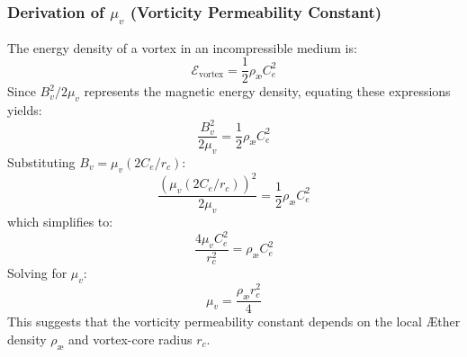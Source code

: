 \subsubsection*{Derivation of $\mu_v$ (Vorticity Permeability Constant)}
    The energy density of a vortex in an incompressible medium is:
    \begin{equation}
        \mathcal{E}_\text{vortex} = \frac{1}{2} \rho_{\text{\ae}} C_e^2
    \end{equation}
    Since $B_v^2 / 2 \mu_v$ represents the magnetic energy density, equating these expressions yields:
    \begin{equation*}
        \frac{B_v^2}{2 \mu_v} = \frac{1}{2} \rho_{\text{\ae}} C_e^2
    \end{equation*}
    Substituting $B_v = \mu_v (2 C_e / r_c)$:
    \begin{equation*}
        \frac{(\mu_v (2 C_e / r_c))^2}{2 \mu_v} = \frac{1}{2} \rho_{\text{\ae}} C_e^2
    \end{equation*}
    which simplifies to:
    \begin{equation*}
        \frac{4 \mu_v C_e^2}{r_c^2} = \rho_{\text{\ae}} C_e^2
    \end{equation*}
    Solving for $\mu_v$:
    \begin{equation}
        \mu_v = \frac{\rho_{\text{\ae}} r_c^2}{4}
    \end{equation}
    This suggests that the vorticity permeability constant depends on the local \AE ther density $\rho_{\text{\ae}}$ and vortex-core radius $r_c$.

